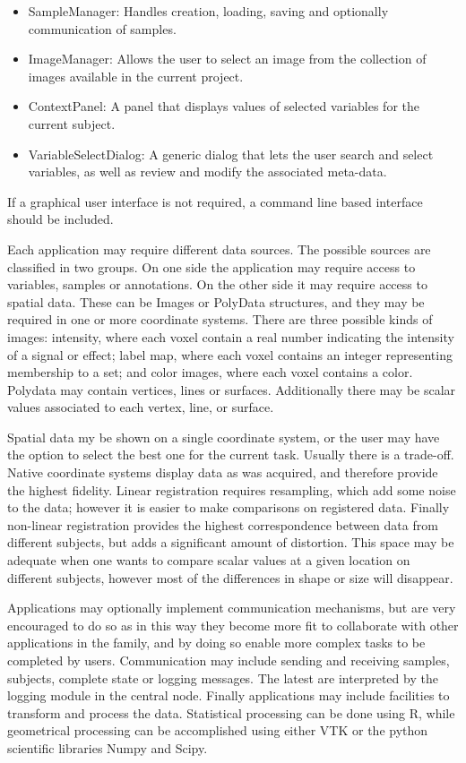 \begin{itemize}
\item SampleManager: Handles creation, loading, saving and optionally communication of samples.
\item ImageManager: Allows the user to select an image from the collection of images available in the current project.
\item ContextPanel: A panel that displays values of selected variables for the current subject.
\item VariableSelectDialog: A generic dialog that lets the user search and select variables, as well as review and modify the associated meta-data.
\end{itemize}
If a graphical user interface is not required, a command line based interface should be included. 

Each application may require different data sources. The possible sources are classified in two groups. On one side the application may require access to variables, samples or annotations. On the other side it may require access to spatial data. These can be Images or PolyData structures, and they may be required in one or more coordinate systems. There are three possible kinds of images: intensity, where each voxel contain a real number indicating the intensity of a signal or effect; label map, where each voxel contains an integer representing membership to a set; and color images, where each voxel contains a color. Polydata may contain vertices, lines or surfaces. Additionally there may be scalar values associated to each vertex, line, or surface. 

Spatial data my be shown on a single coordinate system, or the user may have the option to select the best one for the current task. Usually there is a trade-off. Native coordinate systems display data as was acquired, and therefore provide the highest fidelity. Linear registration requires resampling, which add some noise to the data; however it is easier to make comparisons on registered data. Finally non-linear registration provides the highest correspondence between data from different subjects, but adds a significant amount of distortion. This space may be adequate when one wants to compare scalar values at a given location on different subjects, however most of the differences in shape or size will disappear.

Applications may optionally implement communication mechanisms, but are very encouraged to do so as in this way they become more fit to collaborate with other applications in the family, and by doing so enable more complex tasks to be completed by users. Communication may include sending and receiving samples, subjects, complete state or logging messages. The latest are interpreted by the logging module in the central node. Finally applications may include facilities to transform and process the data. Statistical processing can be done using R, while geometrical processing can be accomplished using either VTK or the python scientific libraries Numpy and Scipy. 

